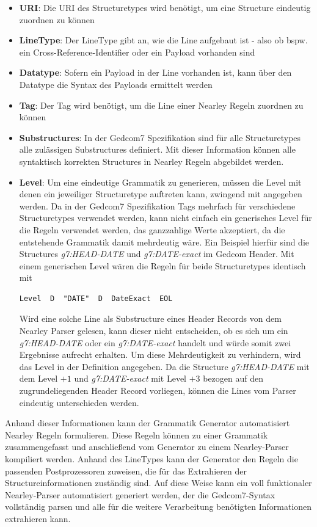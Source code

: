 \begin{itemize}
	\item \textbf{URI}: Die URI des Structuretypes wird benötigt, um eine Structure eindeutig zuordnen zu können 
	\item \textbf{LineType}: Der LineType gibt an, wie die Line aufgebaut ist - also ob bspw. ein Cross-Reference-Identifier oder ein Payload vorhanden sind
	\item \textbf{Datatype}: Sofern ein Payload in der Line vorhanden ist, kann über den Datatype die Syntax des Payloads ermittelt werden
	\item \textbf{Tag}: Der Tag wird benötigt, um die Line einer Nearley Regeln zuordnen zu können
	\item \textbf{Substructures}: In der Gedcom7 Spezifikation sind für alle Structuretypes alle zulässigen Substructures definiert. Mit dieser Information können alle syntaktisch korrekten Structures in Nearley Regeln abgebildet werden.
	\item \textbf{Level}: Um eine eindeutige Grammatik zu generieren, müssen die Level mit denen ein jeweiliger Structuretype auftreten kann, zwingend mit angegeben werden. Da in der Gedcom7 Spezifikation Tags mehrfach für verschiedene Structuretypes verwendet werden, kann nicht einfach ein generisches Level für die Regeln verwendet werden, das ganzzahlige Werte akzeptiert, da die entstehende Grammatik damit mehrdeutig wäre. Ein Beispiel hierfür sind die Structures \textit{g7:HEAD-DATE} und \textit{g7:DATE-exact} im Gedcom Header. Mit einem generischen Level wären die Regeln für beide Structuretypes identisch mit 
	\begin{lstlisting}[frame=none]
	  Level  D  "DATE"  D  DateExact  EOL
	\end{lstlisting}
	Wird eine solche Line als Substructure eines Header Records von dem Nearley Parser gelesen, kann dieser nicht entscheiden, ob es sich um ein \textit{g7:HEAD-DATE} oder ein \textit{g7:DATE-exact} handelt und würde somit zwei Ergebnisse aufrecht erhalten. Um diese Mehrdeutigkeit zu verhindern, wird das Level in der Definition angegeben. Da die Structure \textit{g7:HEAD-DATE} mit dem Level $+1$ und \textit{g7:DATE-exact} mit Level $+3$ bezogen auf den zugrundeliegenden Header Record vorliegen, können die Lines vom Parser eindeutig unterschieden werden.
\end{itemize}
\newpage
Anhand dieser Informationen kann der Grammatik Generator automatisiert Nearley Regeln formulieren. Diese Regeln können zu einer Grammatik zusammengefasst und anschließend vom Generator zu einem Nearley-Parser kompiliert werden. Anhand des LineTypes kann der Generator den Regeln die passenden Postprozessoren zuweisen, die für das Extrahieren der Structureinformationen zuständig sind. Auf diese Weise kann ein voll funktionaler Nearley-Parser automatisiert generiert werden, der die Gedcom7-Syntax vollständig parsen und alle für die weitere Verarbeitung benötigten Informationen extrahieren kann. 


